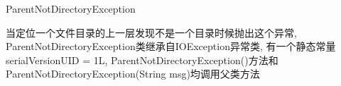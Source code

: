 \begin{XeClass}{ParentNotDirectoryException}
   
 当定位一个文件目录的上一层发现不是一个目录时候抛出这个异常,
 ParentNotDirectoryException类继承自IOException异常类,
 有一个静态常量serialVersionUID = 1L,
 ParentNotDirectoryException()方法和ParentNotDirectoryException(String msg)均调用父类方法

\end{XeClass}
